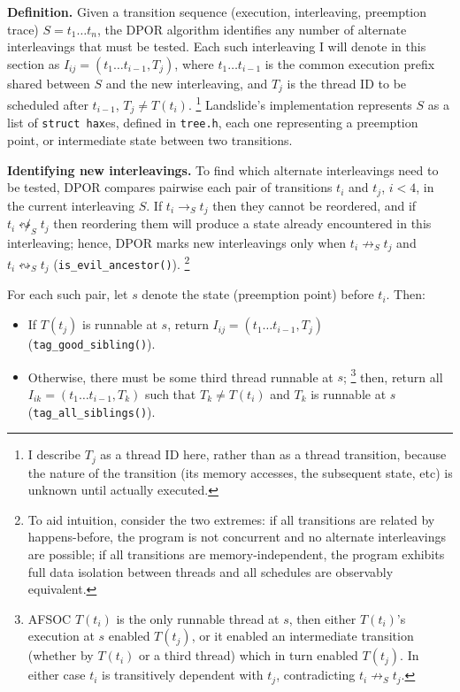 {\bf Definition.}
Given a transition sequence (execution, interleaving, preemption trace) $S = t_1 \dots t_n$,
the DPOR algorithm identifies any number of alternate interleavings that must be tested.
Each such interleaving I will denote in this section as $I_{ij} = (t_1 \dots t_{i-1}, T_j)$,
where $t_1 \dots t_{i-1}$ is the common execution prefix shared between $S$ and the new interleaving,
and $T_j$ is the thread ID to be scheduled after $t_{i-1}$, $T_j \ne T(t_i)$.
\footnote{I describe $T_j$ as a thread ID here, rather than as a thread transition,
because the nature of the transition (its memory accesses, the subsequent state, etc)
is unknown until actually executed.}
Landslide's implementation represents $S$ as a list of {\tt struct hax}es, defined in {\tt tree.h},
each one representing a preemption point, or intermediate state between two transitions.

{\bf Identifying new interleavings.}
To find which alternate interleavings need to be tested,
DPOR compares pairwise each pair of transitions $t_i$ and $t_j$, $i<4$, in the current interleaving $S$.
If $t_i \rightarrow_S t_j$ then they cannot be reordered,
and if $t_i \not\leftrightsquigarrow_S t_j$ then reordering them
will produce a state already encountered in this interleaving;
hence, DPOR marks new interleavings only
when $t_i \not\rightarrow_S t_j$ and $t_i \leftrightsquigarrow_S t_j$
({\tt is\_evil\_ancestor()}).
\footnote{To aid intuition, consider the two extremes:
if all transitions are related by happens-before,
the program is not concurrent and no alternate interleavings are possible;
if all transitions are memory-independent,
the program exhibits full data isolation between threads and all schedules are observably equivalent.}

For each such pair, let $s$ denote the state (preemption point) before $t_i$.
Then:
\begin{itemize}
	\item If $T(t_j)$ is runnable at $s$, return $I_{ij} = (t_1 \dots t_{i-1}, T_j)$ ({\tt tag\_good\_sibling()}).
	\item Otherwise, there must be some third thread runnable at $s$;
		\footnote{AFSOC $T(t_i)$ is the only runnable thread at $s$,
		then either $T(t_i)$'s execution at $s$ enabled $T(t_j)$,
		or it enabled an intermediate transition
		(whether by $T(t_i)$ or a third thread)
		which in turn enabled $T(t_j)$.
		In either case $t_i$ is transitively dependent with $t_j$, contradicting $t_i \not\rightarrow_S t_j$.}
		then, return all $I_{ik} = (t_1 \dots t_{i-1}, T_k)$ such that
		$T_k \ne T(t_i)$ and $T_k$ is runnable at $s$
		({\tt tag\_all\_siblings()}).
\end{itemize}

